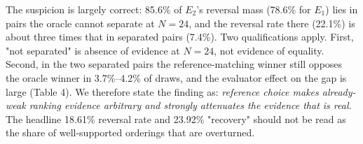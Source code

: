 \documentclass[11pt]{article}
\begin{document}
\begin{table}[htbp]
\centering
\footnotesize
\setlength{\tabcolsep}{3pt}
\caption{Reversals by Oracle Separation (E2; 50,000 Draws)}
\end{table}
The suspicion is largely correct: 85.6\% of $E_2$'s reversal mass (78.6\% for $E_1$) lies in pairs the oracle cannot separate at $N=24$, and the reversal rate there (22.1\%) is about three times that in separated pairs (7.4\%). Two qualifications apply. First, "not separated" is absence of evidence at $N=24$, not evidence of equality. Second, in the two separated pairs the reference-matching winner still opposes the oracle winner in 3.7\%--4.2\% of draws, and the evaluator effect on the gap is large (Table 4). We therefore state the finding as: \emph{reference choice makes already-weak ranking evidence arbitrary and strongly attenuates the evidence that is real.} The headline 18.61\% reversal rate and 23.92\% "recovery" should not be read as the share of well-supported orderings that are overturned.
\end{document}
